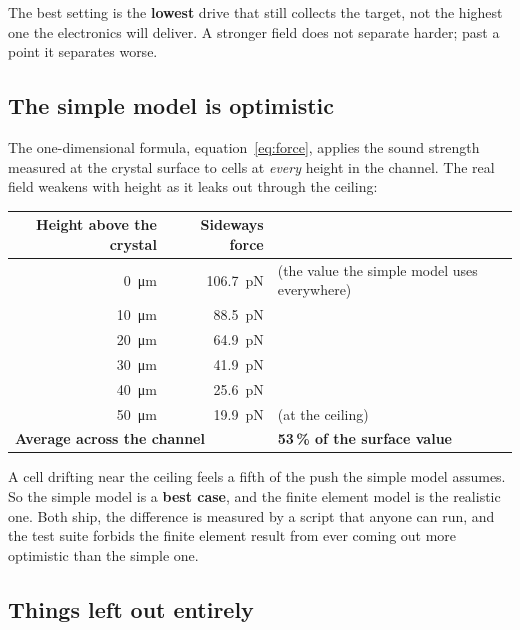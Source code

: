 \documentclass[11pt,a4paper]{article}
\begin{document}
\begin{warnbox}
The best setting is the \textbf{lowest} drive that still collects the target,
not the highest one the electronics will deliver. A stronger field does not
separate harder; past a point it separates worse.
\end{warnbox}

\subsection*{The simple model is optimistic}

The one-dimensional formula, equation~\eqref{eq:force}, applies the sound
strength measured at the crystal surface to cells at \emph{every} height in the
channel. The real field weakens with height as it leaks out through the ceiling:

\begin{center}\small
\begin{tabular}{rrl}
\toprule
\textbf{Height above the crystal} & \textbf{Sideways force} & \\
\midrule
\SI{0}{\micro\meter}  & \SI{106.7}{\pico\newton} & (the value the simple model uses everywhere) \\
\SI{10}{\micro\meter} & \SI{88.5}{\pico\newton}  & \\
\SI{20}{\micro\meter} & \SI{64.9}{\pico\newton}  & \\
\SI{30}{\micro\meter} & \SI{41.9}{\pico\newton}  & \\
\SI{40}{\micro\meter} & \SI{25.6}{\pico\newton}  & \\
\SI{50}{\micro\meter} & \SI{19.9}{\pico\newton}  & (at the ceiling) \\
\midrule
\multicolumn{2}{l}{\textbf{Average across the channel}} & \textbf{53\,\% of the surface value} \\
\bottomrule
\end{tabular}
\end{center}

A cell drifting near the ceiling feels a fifth of the push the simple model
assumes. So the simple model is a \textbf{best case}, and the finite element
model is the realistic one. Both ship, the difference is measured by a script
that anyone can run, and the test suite forbids the finite element result from
ever coming out more optimistic than the simple one.

\subsection*{Things left out entirely}
\end{document}
